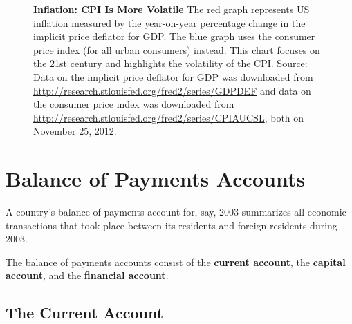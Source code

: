 \documentclass[
  letterpaper,
]{book}
\theoremstyle{plain}
\theoremstyle{remark}
\begin{document}
\begin{figure}


\caption{\label{fig-cpi-volatile}\textbf{Inflation: CPI Is More
Volatile} The red graph represents US inflation measured by the
year-on-year percentage change in the implicit price deflator for GDP.
The blue graph uses the consumer price index (for all urban consumers)
instead. This chart focuses on the 21st century and highlights the
volatility of the CPI. Source: Data on the implicit price deflator for
GDP was downloaded from
\url{http://research.stlouisfed.org/fred2/series/GDPDEF} and data on the
consumer price index was downloaded from
\url{http://research.stlouisfed.org/fred2/series/CPIAUCSL}, both on
November 25, 2012.}

\end{figure}%


\chapter{Balance of Payments Accounts}\label{sec-bopacc}

A country's balance of payments account for,
say, 2003 summarizes all economic transactions that took place between
its residents and foreign residents during 2003.

The balance of payments accounts consist of the \textbf{current
account}, the \textbf{capital account}, and the \textbf{financial
account}.

\section{The Current Account}\label{sec-curacc}
\end{document}
